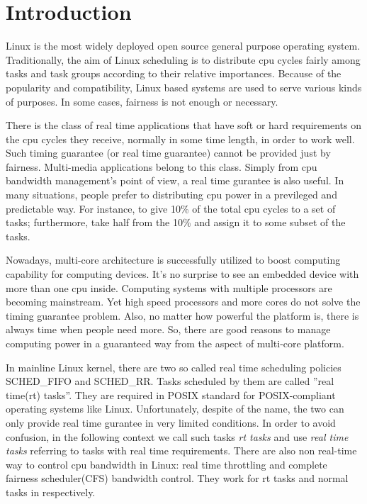 \chapter{Introduction\label{chap:introduction}}

Linux is the most widely deployed open source general purpose
operating system. Traditionally, the aim of Linux scheduling is to
distribute cpu cycles fairly among tasks and task groups according to
their relative importances. Because of the popularity and
compatibility, Linux based systems are used to serve various kinds of
purposes. In some cases, fairness is not enough or necessary.

There is the class of real time applications 
that have soft or hard requirements on the cpu cycles they receive,
normally in some time length, in order to work well. Such timing
guarantee (or real time guarantee) cannot be provided just by fairness. 
Multi-media applications belong to this class. Simply from cpu bandwidth 
management's point of view, a real time gurantee is also useful. In many 
situations, people prefer to distributing cpu power in a previleged and 
predictable way. For instance, to give 10\% of the total cpu cycles to a 
set of tasks; furthermore, take half from the 10\% and assign it to some 
subset of the tasks.

Nowadays, multi-core architecture is successfully utilized to boost 
computing capability for computing devices. It's no surprise to see an 
embedded device with more than one cpu inside. Computing systems with 
multiple processors are becoming mainstream. 
Yet high speed processors and more cores do not solve the
timing guarantee problem. Also, no matter how powerful the platform is,
there is always time when people need more. So, there are good reasons to
manage computing power in a guaranteed way from the aspect of multi-core 
platform.

In mainline Linux kernel, there are two so called real time scheduling 
policies SCHED\_FIFO and SCHED\_RR. Tasks scheduled by them are called 
''real time(rt) tasks''. They are required in POSIX standard for 
POSIX-compliant operating systems like Linux. Unfortunately, despite of 
the name, the two can only provide real time gurantee in very limited 
conditions. In order to avoid confusion, in the following context
we call such tasks \emph{rt tasks} and use \emph{real time tasks} referring
to tasks with real time requirements. 
There are also non real-time way to control cpu bandwidth in Linux: real time 
throttling and complete fairness scheduler(CFS) bandwidth control. 
They work for rt tasks and normal tasks in respectively.

